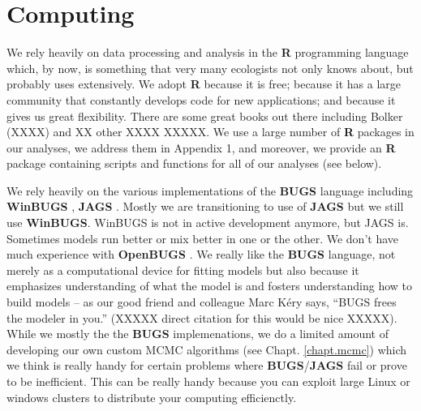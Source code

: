 \section*{Computing}

We rely heavily on data processing and analysis in the {\bf R}
programming language which, by now, is something that very many
ecologists not only knows about, but probably uses extensively. We
adopt {\bf R} because
it is free; because it has a large community that constantly develops
code for new applications; and because it gives us great flexibility.
There are some great books out there including Bolker (XXXX) and XX
other XXXX XXXXX. We use a large number of {\bf R} packages in our
analyses, we address them in Appendix 1, and moreover, we provide an
{\bf R} package containing scripts and functions for all of our
analyses (see below).

We rely heavily on the various implementations of the {\bf BUGS}
language including {\bf WinBUGS} \citep{lunn_etal:2000}, {\bf JAGS}
\citep{plummer:2003}.  Mostly we are transitioning to use of {\bf
  JAGS} but we still use {\bf WinBUGS}.  WinBUGS is not in active
development anymore, but JAGS is. Sometimes models run better or mix
better in one or the other. We don't have much experience with {\bf
  OpenBUGS} \citep{thomas_etal:2006}. We really like the {\bf BUGS}
language, not merely as a computational device for fitting models but
also because it emphasizes understanding of what the model is and
fosters understanding how to build models -- as our good friend and
colleague Marc K\'{e}ry says, ``BUGS frees the modeler in you.''
(XXXXX direct citation for this would be nice XXXXX).
While we mostly the the {\bf BUGS} implemenations, we do a limited
amount of developing our own custom MCMC algorithms (see
Chapt. \ref{chapt.mcmc}) which we think is really handy for certain
problems where {\bf BUGS}/{\bf JAGS} fail or prove to be inefficient.
This can be really handy because you can exploit large Linux or
windows clusters to distribute your computing efficienctly.

